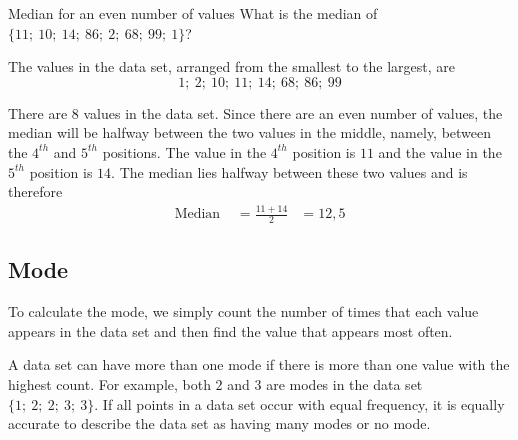 \begin{wex}{Median for an even number of values}{
  What is the median of $\{11;\ 10;\ 14;\ 86;\ 2;\ 68;\ 99;\ 1\}$?
}{

  The values in the data set, arranged from the smallest to the largest, are
  \begin{equation*}
    1;\ 2;\ 10;\ 11;\ 14;\ 68;\ 86;\ 99
  \end{equation*}


  There are $8$ values in the data set. Since there are an even number
  of values, the median will be halfway between the two values in the
  middle, namely, between the $4^{th}$ and $5^{th}$ positions. The value in the
  $4^{th}$ position is $11$ and the value in the $5^{th}$ position is
  $14$. The median lies halfway between these two values and is
  therefore
  \begin{align*}
    \mbox{Median } &=\frac{11+14}{2} 
&= 12,5
  \end{align*}
}
\end{wex}

\subsection{Mode}

To calculate the mode, we simply count the number of times that each
value appears in the data set and then find the value that appears
most often.

A data set can have more than one mode if there is more than one value
with the highest count. For example, both $2$ and $3$ are modes in the
data set $\{1;\ 2;\ 2;\ 3;\ 3\}$. If all points in a data set occur
with equal frequency, it is equally accurate to describe the data set
as having many modes or no mode.

